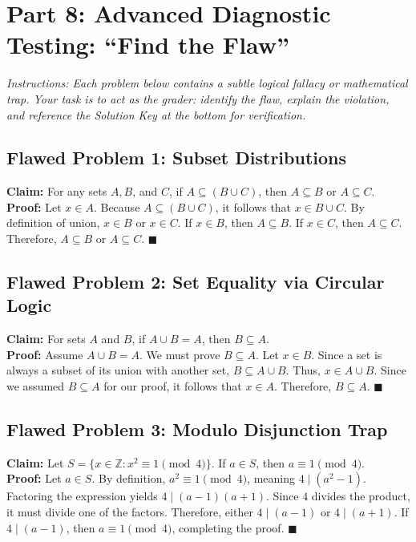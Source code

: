 \documentclass[11pt]{article}
\begin{document}
\section{Part 8: Advanced Diagnostic Testing: ``Find the Flaw''}
\textit{Instructions: Each problem below contains a subtle logical fallacy or mathematical trap. Your task is to act as the grader: identify the flaw, explain the violation, and reference the Solution Key at the bottom for verification.}

\subsection{Flawed Problem 1: Subset Distributions}
\textbf{Claim:} For any sets $A, B$, and $C$, if $A \subseteq (B \cup C)$, then $A \subseteq B$ or $A \subseteq C$. \\
\textbf{Proof:} Let $x \in A$. Because $A \subseteq (B \cup C)$, it follows that $x \in B \cup C$. By definition of union, $x \in B$ or $x \in C$. 
If $x \in B$, then $A \subseteq B$. If $x \in C$, then $A \subseteq C$. Therefore, $A \subseteq B$ or $A \subseteq C$. $\blacksquare$

\subsection{Flawed Problem 2: Set Equality via Circular Logic}
\textbf{Claim:} For sets $A$ and $B$, if $A \cup B = A$, then $B \subseteq A$. \\
\textbf{Proof:} Assume $A \cup B = A$. We must prove $B \subseteq A$. Let $x \in B$. Since a set is always a subset of its union with another set, $B \subseteq A \cup B$. Thus, $x \in A \cup B$. Since we assumed $B \subseteq A$ for our proof, it follows that $x \in A$. Therefore, $B \subseteq A$. $\blacksquare$

\subsection{Flawed Problem 3: Modulo Disjunction Trap}
\textbf{Claim:} Let $S = \{x \in \mathbb{Z} : x^2 \equiv 1 \pmod 4\}$. If $a \in S$, then $a \equiv 1 \pmod 4$. \\
\textbf{Proof:} Let $a \in S$. By definition, $a^2 \equiv 1 \pmod 4$, meaning $4 \mid (a^2 - 1)$. Factoring the expression yields $4 \mid (a - 1)(a + 1)$. Since $4$ divides the product, it must divide one of the factors. Therefore, either $4 \mid (a - 1)$ or $4 \mid (a + 1)$. If $4 \mid (a - 1)$, then $a \equiv 1 \pmod 4$, completing the proof. $\blacksquare$
\end{document}
